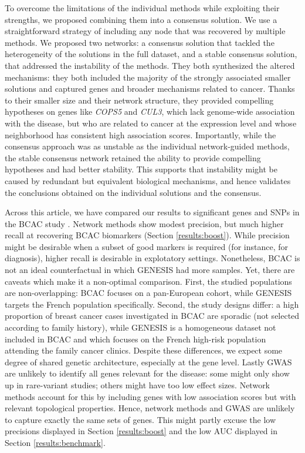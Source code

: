 \documentclass[10pt,letterpaper]{article}
\begin{document}
To overcome the limitations of the individual methods while exploiting their strengths, we proposed combining them into a consensus solution. We use a straightforward strategy of including any node that was recovered by multiple methods. We proposed two networks: a consensus solution that tackled the heterogeneity of the solutions in the full dataset, and a stable consensus solution, that addressed the instability of the methods. They both synthesized the altered mechanisms: they both included the majority of the strongly associated smaller solutions and captured genes and broader mechanisms related to cancer. Thanks to their smaller size and their network structure, they provided compelling hypotheses on genes like \emph{COPS5} and \emph{CUL3}, which lack genome-wide association with the disease, but who are related to cancer at the expression level and whose neighborhood has consistent high association scores. Importantly, while the consensus approach was as unstable as the individual network-guided methods, the stable consensus network retained the ability to provide compelling hypotheses and had better stability. This supports that instability might be caused by redundant but equivalent biological mechanisms, and hence validates the conclusions obtained on the individual solutions and the consensus.

Across this article, we have compared our results to significant genes and SNPs in the BCAC study \cite{Michailidou2017}. Network methods show modest precision, but much higher recall at recovering BCAC biomarkers (Section \ref{results:boost}). While precision might be desirable when a subset of good markers is required (for instance, for diagnosis), higher recall is desirable in explotatory settings. Nonetheless, BCAC is not an ideal counterfactual in which GENESIS had more samples. Yet, there are caveats which make it a non-optimal comparison. First, the studied populations are non-overlapping: BCAC focuses on a pan-European cohort, while GENESIS targets the French population specifically. Second, the study designs differ: a high proportion of breast cancer cases investigated in BCAC are sporadic (not selected according to family history), while GENESIS is a homogeneous dataset not included in BCAC and which focuses on the French high-risk population attending the family cancer clinics. Despite these differences, we expect some degree of shared genetic architecture, especially at the gene level. Lastly GWAS are unlikely to identify all genes relevant for the disease: some might only show up in rare-variant studies; others might have too low effect sizes. Network methods account for this by including genes with low association scores but with relevant topological properties. Hence, network methods and GWAS are unlikely to capture exactly the same sets of genes. This might partly excuse the low precisions displayed in Section \ref{results:boost} and the low AUC displayed in Section \ref{results:benchmark}.
\end{document}
